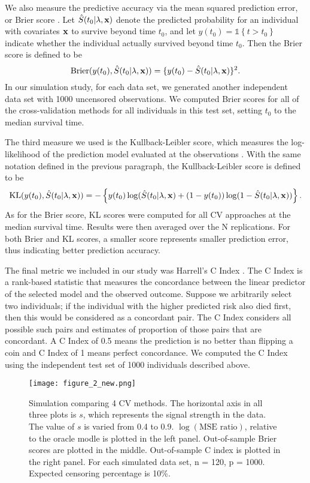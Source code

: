 We also measure the predictive accuracy via the mean squared prediction error, or Brier score \citep{VanHouwelingen2011}. Let $\hat{S}(t_0|\lambda, \mathbf{x})$ denote the predicted probability for an individual with covariates $\mathbf{x}$ to survive beyond time $t_0$, and let $y(t_0) = \mathbb{1}\left\{ t > t_{0}\right\}$ indicate whether the individual actually survived beyond time $t_0$. Then the Brier score is defined to be
\begin{equation}
\text{Brier}(y(t_0), \hat{S}(t_0|\lambda, \mathbf{x})) = \{ y(t_0) - \hat{S}(t_0|\lambda, \mathbf{x}) \}^2.
\end{equation}
In our simulation study, for each data set, we generated another independent data set with 1000 uncensored observations. We computed Brier scores for all of the cross-validation methods for all individuals in this test set, setting $t_0$ to the median survival time.

The third measure we used is the Kullback-Leibler score, which measures the log-likelihood of the prediction model evaluated at the observations \citep{VanHouwelingen2011}. With the same notation defined in the previous paragraph, the Kullback-Leibler score is defined to be
$$ \text{KL}(y(t_0), \hat{S}(t_0|\lambda, \mathbf{x})) = -\left\{ y(t_0)\log(\hat{S}(t_0|\lambda, \mathbf{x}) + (1 - y(t_0))\log(1 - \hat{S}(t_0|\lambda, \mathbf{x})) \right\}. $$
As for the Brier score, KL scores were computed for all CV approaches at the median survival time.  Results were then averaged over the N replications. For both Brier and KL scores, a smaller score represents smaller prediction error, thus indicating better prediction accuracy.

The final metric we included in our study was Harrell's C Index \citep{HarrellJr1984}. The C Index is a rank-based statistic that measures the concordance between the linear predictor of the selected model and the observed outcome. Suppose we arbitrarily select two individuals; if the individual with the higher predicted risk also died first, then this would be considered as a concordant pair. The C Index considers all possible such pairs and estimates of proportion of those pairs that are concordant. A C Index of 0.5 means the prediction is no better than flipping a coin and C Index of 1 means perfect concordance. We computed the C Index using the independent test set of 1000 individuals described above.

\begin{figure}[ht]
  \centering
  \texttt{[image: figure\_2\_new.png]}
  \caption{\label{Fig:mse-brier-c} Simulation comparing 4 CV methods. The horizontal axis in all three plots is $s$, which represents the signal strength in the data. The value of $s$ is varied from 0.4 to 0.9. $\log(\text{MSE ratio})$, relative to the oracle modle is plotted in the left panel. Out-of-sample Brier scores are plotted in the middle. Out-of-sample C index is plotted in the right panel. For each simulated data set, n = 120, p = 1000. Expected censoring percentage is 10\%.}
\end{figure}	

